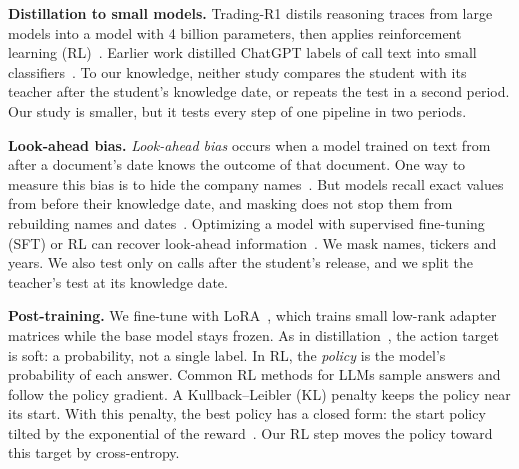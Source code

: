 \documentclass[sigconf,nonacm]{acmart}
\begin{document}
\textbf{Distillation to small models.}
Trading-R1 distils reasoning traces from large models into a model with 4 billion parameters, then applies reinforcement learning (RL)~\cite{xiao2025tradingr1}.
Earlier work distilled ChatGPT labels of call text into small classifiers~\cite{gandouet2024distilled}.
To our knowledge, neither study compares the student with its teacher after the student's knowledge date, or repeats the test in a second period.
Our study is smaller, but it tests every step of one pipeline in two periods.

\textbf{Look-ahead bias.}
\emph{Look-ahead bias} occurs when a model trained on text from after a document's date knows the outcome of that document.
One way to measure this bias is to hide the company names~\cite{glassermanlin2023}.
But models recall exact values from before their knowledge date, and masking does not stop them from rebuilding names and dates~\cite{lopezlira2025memorization}.
Optimizing a model with supervised fine-tuning (SFT) or RL can recover look-ahead information~\cite{koijenlevy2026}.
We mask names, tickers and years.
We also test only on calls after the student's release, and we split the teacher's test at its knowledge date.

\textbf{Post-training.}
We fine-tune with LoRA~\cite{hu2022lora}, which trains small low-rank adapter matrices while the base model stays frozen.
As in distillation~\cite{hinton2015}, the action target is soft: a probability, not a single label.
In RL, the \emph{policy} is the model's probability of each answer.
Common RL methods for LLMs sample answers and follow the policy gradient.
A Kullback--Leibler (KL) penalty keeps the policy near its start.
With this penalty, the best policy has a closed form: the start policy tilted by the exponential of the reward~\cite{korbak2022kl}.
Our RL step moves the policy toward this target by cross-entropy.
\end{document}
